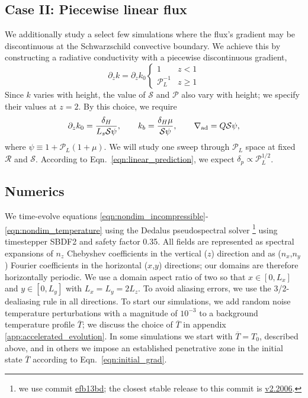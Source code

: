 \documentclass[twocolumn]{aastex631}
\newcommand{\gradad}{\ensuremath{\nabla_{\rm{ad}}}}
\newcommand{\mP}{\ensuremath{\mathcal{P}}}
\newcommand{\mR}{\ensuremath{\mathcal{R}}}
\newcommand{\mS}{\ensuremath{\mathcal{S}}}
\renewcommand{\bar}[1]{\overline{#1}}
\begin{document}
\subsection{Case II: Piecewise linear flux}
We additionally study a select few simulations where the flux's gradient may be discontinuous at the Schwarzschild convective boundary.
We achieve this by constructing a radiative conductivity with a piecewise discontinuous gradient,
\begin{equation}
\partial_z k = \partial_z k_0
\begin{cases}
1	&	z < 1 \\
\mP_L^{-1} &	z \geq 1
\end{cases}
\label{eqn:sim_linear_k}
\end{equation}
Since $k$ varies with height, the value of $\mS$ and $\mP$ also vary with height; we specify their values at $z = 2$.
By this choice, we require
\begin{equation}
\partial_z k_0 = \frac{\delta_H}{L_s \mS \psi},\qquad
k_b = \frac{\delta_H\mu}{\mS\psi},\qquad
\gradad = Q \mS \psi,
\end{equation}
where $\psi \equiv 1 + \mP_L(1 + \mu)$.
We will study one sweep through $\mP_L$ space at fixed $\mR$ and $\mS$.
According to Eqn.~\ref{eqn:linear_prediction}, we expect $\delta_p \propto \mP_L^{1/2}$.

\subsection{Numerics}
\label{sct:numerics}
We time-evolve equations \ref{eqn:nondim_incompressible}-\ref{eqn:nondim_temperature} using the Dedalus pseudospectral solver \citep{burns_etal_2020}\footnote{we use commit \href{https://github.com/DedalusProject/dedalus/commit/efb13bdaa09816dde3eee897bc2a15fc284ea2f1}{efb13bd}; the closest stable release to this commit is \href{https://github.com/DedalusProject/dedalus/releases/tag/v2.2006}{v2.2006}.} using timestepper SBDF2 \citep{wang&ruuth2008} and safety factor 0.35.
All fields are represented as spectral expansions of $n_z$ Chebyshev coefficients in the vertical ($z$) direction and as ($n_x$,$n_y$) Fourier coefficients in the horizontal ($x$,$y$) directions; our domains are therefore horizontally periodic.
We use a domain aspect ratio of two so that $x \in [0, L_x]$ and $y \in [0, L_y]$ with $L_x = L_y = 2 L_z$.
To avoid aliasing errors, we use the 3/2-dealiasing rule in all directions.
To start our simulations, we add random noise temperature perturbations with a magnitude of $10^{-3}$ to a background temperature profile $\overline{T}$; we discuss the choice of $\overline{T}$ in appendix \ref{app:accelerated_evolution}.
In some simulations we start with $\bar{T} = T_0$, described above, and in others we impose an established penetrative zone in the initial state $\bar{T}$ according to Eqn.~\ref{eqn:initial_grad}.
\end{document}
